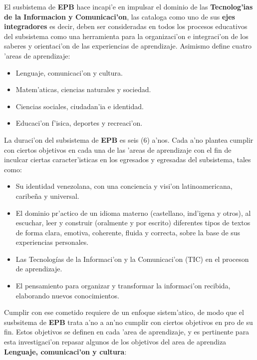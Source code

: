 El susbistema de \textbf{EPB} hace incapi'e en impulsar el dominio de las \textbf{Tecnolog'ias de la Informacion y Comunicaci'on}, las cataloga como uno de sus \textbf{ejes integradores} es decir, deben ser consideradas en todos los procesos educativos del subsistema como una herramienta para la organizaci'on e integraci'on de los saberes y orientaci'on de las experiencias de aprendizaje. Asimismo define cuatro 'areas de aprendizaje: 

\begin{itemize}
	\item Lenguaje, comunicaci'on y cultura.
	\item Matem'aticas, ciencias naturales y sociedad.
	\item Ciencias sociales, ciudadan'ia e identidad.
	\item Educaci'on f'isica, deportes y recreaci'on.
\end{itemize}

La duraci'on del subsistema de \textbf{EPB} es seis (6) a'nos. Cada a'no plantea cumplir con ciertos objetivos en cada una de las 'areas de aprendizaje con el fin de inculcar ciertas caracter'isticas en los egresados y egresadas del subsistema, tales como:

\begin{itemize}
	\item Su identidad venezolana, con una conciencia y visi'on latinoamericana,
	caribeña y universal.
	\item El dominio pr'actico de un idioma materno (castellano, ind'igena y otros), al escuchar, leer y construir (oralmente y por escrito) diferentes tipos de textos de forma clara, emotiva, coherente, fluida y correcta, sobre la base de sus experiencias personales.
	\item Las Tecnologías de la Informaci'on y la Comunicaci'on (TIC) en el proceson de aprendizaje.
	\item El pensamiento para organizar y transformar la informaci'on recibida,
	elaborando nuevos conocimientos. 
\end{itemize}

Cumplir con ese cometido requiere de un enfoque sistem'atico, de modo que el susbsitema de \textbf{EPB} trata a'no a an'no cumplir con ciertos objetivos en pro de su fin. Estos objetivos se definen en cada 'area de aprendizaje, y es pertinente para esta investigaci'on repasar algunos de los objetivos del area de aprendiza \textbf{Lenguaje, comunicaci'on y cultura}:

